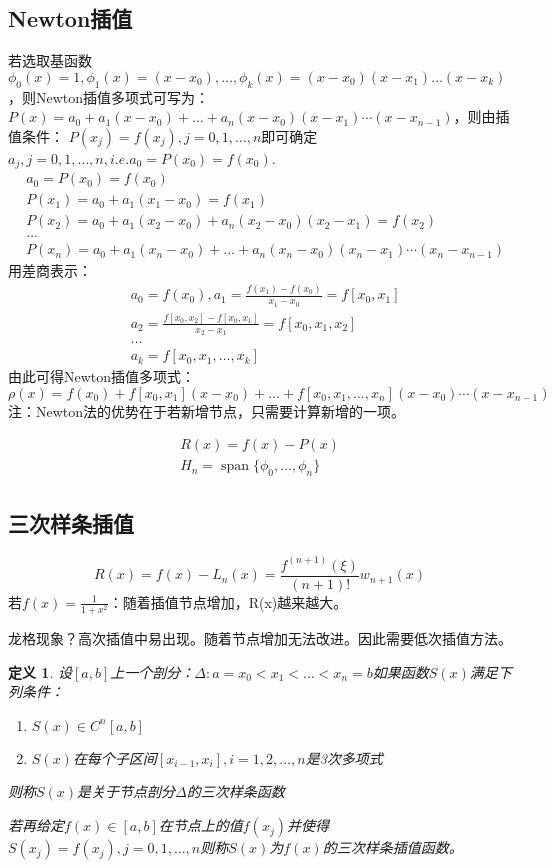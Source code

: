 \documentclass[a4paper]{article}
\newtheorem{definition}{定义}[section]
\DeclareMathOperator{\spn}{span}
\begin{document}
\subsection{Newton插值}
若选取基函数$\phi_0(x)=1, \phi_1(x)=(x-x_0), \dots, \phi_k(x)=(x-x_0)(x-x_1)\dots(x-x_k) $，则Newton插值多项式可写为：$P(x)=a_0+a_1(x-x_0)+\dots+a_n(x-x_0)(x-x_1)\cdots(x-x_{n-1}) $，则由插值条件：
$P(x_j)=f(x_j),j=0,1,\dots, n $即可确定$a_j, j=0,1,\dots, n, i.e. a_0=P(x_0)=f(x_0) $.
\begin{align*}
    &a_0 = P(x_0) = f(x_0)\\
    &P(x_1)=a_0+a_1(x_1-x_0) = f(x_1) \\
    &P(x_2)=a_0+a_1(x_2-x_0)+a_n(x_2-x_0)(x_2-x_1) =f(x_2) \\
    &\dots \\
    &P(x_n)=a_0+a_1(x_n-x_0)+\dots+a_n(x_n-x_0)(x_n-x_1)\cdots(x_n-x_{n-1}) 
\end{align*}
用差商表示：
\begin{align*}
    &a_0=f(x_0), a_1 = \frac{f(x_1)-f(x_0)}{x_1-x_0}=f[x_0, x_1]  \\
    &a_2 = \frac{f[x_0, x_2]-f[x_0, x_1]}{x_2-x_1} = f[x_0, x_1, x_2] \\
    &\dots \\
    &a_k = f[x_0, x_1, \dots, x_k]
\end{align*}
由此可得Newton插值多项式：
\begin{equation}
    \rho(x) = f(x_0)+f[x_0,x_1](x-x_0) + \dots + f[x_0, x_1, \dots, x_n](x-x_0)\cdots(x-x_{n-1})
\end{equation}
注：Newton法的优势在于若新增节点，只需要计算新增的一项。

\begin{align*}
    R(x) = f(x)-P(x) \\
    H_n = \spn\{\phi_0, \dots, \phi_n\}
\end{align*}

\subsection{三次样条插值}
$$
R(x) = f(x)-L_n(x) = \frac{f^{(n+1)}(\xi)}{(n+1)!}w_{n+1}(x)
$$
若$f(x)=\frac{1}{1+x^2}$：随着插值节点增加，R(x)越来越大。

龙格现象？高次插值中易出现。随着节点增加无法改进。因此需要低次插值方法。

\begin{definition}
    设$[a,b]$上一个剖分：$\Delta: a=x_0<x_1<\dots<x_n=b$如果函数$S(x)$满足下列条件：
    \begin{enumerate}
        \item $S(x) \in C^n[a,b] $
        \item $S(x)$在每个子区间$[x_{i-1}, x_i],i=1,2,\dots, n$是3次多项式
    \end{enumerate}
    则称$S(x)$是关于节点剖分$\Delta$的三次样条函数
    
    若再给定$f(x)\in [a,b] $在节点上的值$f(x_j) $并使得$S(x_j)=f(x_j),j=0,1,\dots,n $则称$S(x) $为$f(x)$的三次样条插值函数。
\end{definition}
\end{document}
